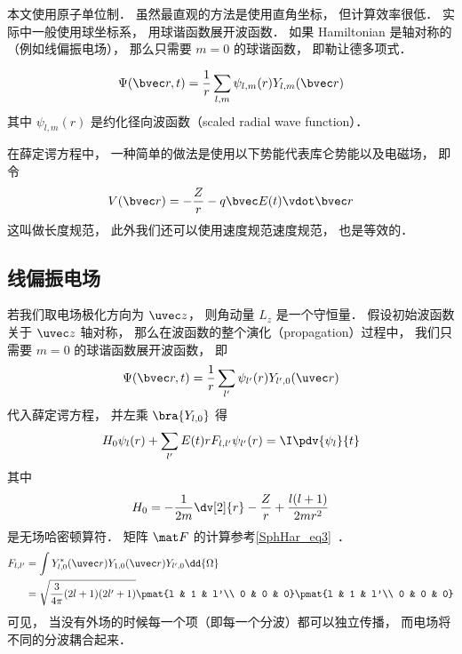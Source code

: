 

本文使用原子单位制． 虽然最直观的方法是使用直角坐标， 但计算效率很低． 实际中一般使用球坐标系， 用球谐函数展开波函数． 如果 Hamiltonian 是轴对称的（例如线偏振电场）， 那么只需要 $m = 0$ 的球谐函数， 即勒让德多项式．

\begin{equation}
\Psi(\bvec r, t) = \frac{1}{r}\sum_{l,m} \psi_{l,m}(r) Y_{l,m}(\bvec r)
\end{equation}
其中 $\psi_{l,m}(r)$ 是约化径向波函数（scaled radial wave function）．

在薛定谔方程中， 一种简单的做法是使用以下势能代表库仑势能以及电磁场， 即令
\begin{equation}
V(\bvec r) = -\frac{Z}{r} - q\bvec E(t) \vdot \bvec r
\end{equation}
这叫做长度规范， 此外我们还可以使用速度规范速度规范， 也是等效的．

\subsection{线偏振电场}
若我们取电场极化方向为 $\uvec z$， 则角动量 $L_z$ 是一个守恒量． 假设初始波函数关于 $\uvec z$ 轴对称， 那么在波函数的整个演化（propagation）过程中， 我们只需要 $m=0$ 的球谐函数展开波函数， 即
\begin{equation}
\Psi(\bvec r, t) = \frac{1}{r}\sum_{l'} \psi_{l'}(r) Y_{l', 0}(\uvec r)
\end{equation}
代入薛定谔方程， 并左乘 $\bra{Y_{l,0}}$ 得
\begin{equation}\label{HyTDSE_eq4}
H_0 \psi_{l}(r) + \sum_{l'} E(t)rF_{l, l'} \psi_{l'}(r) = \I \pdv{\psi_{l}}{t}
\end{equation}
其中
\begin{equation}
H_0 = -\frac{1}{2m} \dv[2]{r} -\frac{Z}{r} + \frac{l(l+1)}{2mr^2}
\end{equation}
是无场哈密顿算符． 矩阵 $\mat F$ 的计算参考\autoref{SphHar_eq3}~．
\begin{equation}
\begin{aligned}
F_{l,l'} &= \int Y_{l,0}^*(\uvec r) Y_{1,0}(\uvec r) Y_{l',0} \dd{\Omega}\\
&= \sqrt{\frac{3}{4\pi} (2l+1)(2l'+1)} \pmat{l & 1 & l'\\ 0 & 0 & 0}\pmat{l & 1 & l'\\ 0 & 0 & 0}
\end{aligned}
\end{equation}
可见， 当没有外场的时候每一个项（即每一个分波）都可以独立传播， 而电场将不同的分波耦合起来．

